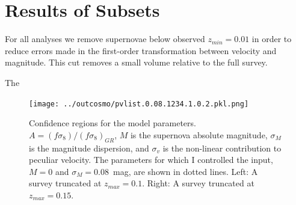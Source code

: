 \documentclass{aastex62}   	%
\begin{document}
\section{Results of Subsets}

For all analyses we remove supernovae below observed $z_{min}=0.01$ in order to
reduce errors made in the first-order transformation between velocity and
magnitude.  This cut removes a  small volume relative to the full survey.

The 
\begin{figure}
\centering
\texttt{[image: ../outcosmo/pvlist.0.08.1234.1.0.2.pkl.png]}
\caption{Confidence regions for the model parameters.  $A=(f\sigma_8)/(f\sigma_8)_{GR}$, $M$ is the supernova
absolute magnitude, $\sigma_M$ is the magnitude dispersion, and $\sigma_v$ is the non-linear contribution
to peculiar velocity.   The parameters for which I controlled the input, $M=0$ and $\sigma_M=0.08$~mag, are shown in dotted lines.
 Left: A survey truncated at $z_{max}=0.1$.  Right: A survey truncated at $z_{max}=0.15$.
\label{zmax:fig}}
\end{figure}
\end{document}
